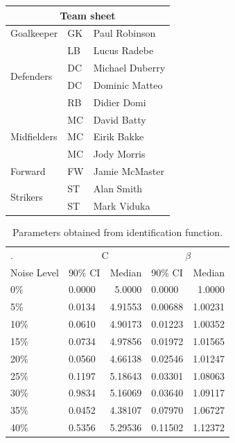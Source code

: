 \documentclass[a4paper, 12pt]{article}
\begin{document}
\begin{tabular}{|l|l|l|} 
\hline 
\multicolumn{3}{|c|}{Team sheet} \\ 
\hline Goalkeeper & GK & Paul Robinson \\ 
\hline 
\multirow{4}{*}{Defenders} & LB & Lucus Radebe \\ 
& DC & Michael Duberry \\ & DC & Dominic Matteo \\ 
& RB & Didier Domi \\ 
\hline 
\multirow{3}{*}{Midfielders} & MC & David Batty \\ 
& MC & Eirik Bakke \\ 
& MC & Jody Morris \\ 
\hline Forward & FW & Jamie McMaster \\ 
\hline \multirow{2}{*}{Strikers} & ST & Alan Smith \\ 
& ST & Mark Viduka \\ 
\hline \end{tabular}


\begin{table}
\centering
\begin{tabular}{llrlr}
\hline
. &
\multicolumn{2}{c}{C} & \multicolumn{2}{c}{$\beta$} \\
Noise Level & 90\% CI & Median & 90\% CI & Median\\
\hline
0\%  & 0.0000 & 5.0000 & 0.0000 & 1.0000 \\
5\%  & 0.0134 & 4.91553 & 0.00688 & 1.00231\\
10\% & 0.0610 & 4.90173 & 0.01223 & 1.00352\\
15\% & 0.0734 & 4.97856 & 0.01972& 1.01565 \\
20\% & 0.0560 & 4.66138 & 0.02546 & 1.01247 \\
25\% & 0.1197 & 5.18643 & 0.03301& 1.08063 \\
30\% & 0.9834 & 5.16069 & 0.03640 & 1.09117 \\
35\% & 0.0452 & 4.38107 & 0.07970 & 1.06727 \\
40\% & 0.5356 & 5.29536 & 0.11502 & 1.12372 \\
\hline
\end{tabular}
\label{tab:noise}
\caption{Parameters obtained from identification function.}
\end{table}
\end{document}
